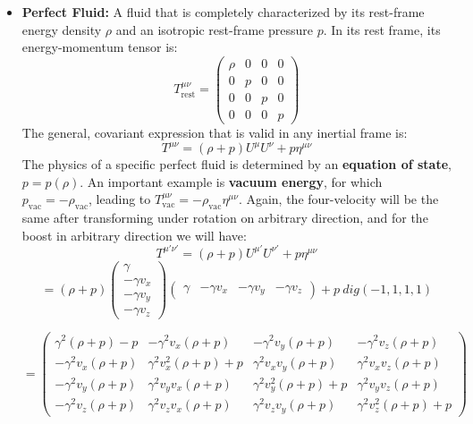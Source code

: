 \documentclass[11pt, a4paper]{report}
\begin{document}
\begin{itemize}
\begin{figure}[h]
\begin{tikzpicture}[scale=1]
\end{tikzpicture}
\caption{Comparison between dust and a perfect fluid. Pressure introduces internal stresses.}
\end{figure}
    \item \textbf{Perfect Fluid:} A fluid that is completely characterized by its rest-frame energy density $\rho$ and an isotropic rest-frame pressure $p$. In its rest frame, its energy-momentum tensor is:
    \begin{equation}
        T^{\mu\nu}_{\text{rest}} =
        \begin{pmatrix}
            \rho & 0 & 0 & 0 \\
            0 & p & 0 & 0 \\
            0 & 0 & p & 0 \\
            0 & 0 & 0 & p
        \end{pmatrix}
    \end{equation}
    The general, covariant expression that is valid in any inertial frame is:
    \begin{equation}
        T^{\mu\nu} = (\rho+p)U^\mu U^\nu + p\eta^{\mu\nu}
    \end{equation}
    The physics of a specific perfect fluid is determined by an \textbf{equation of state}, $p = p(\rho)$. An important example is \textbf{vacuum energy}, for which $p_{\text{vac}} = -\rho_{\text{vac}}$, leading to $T^{\mu\nu}_{\text{vac}} = -\rho_{\text{vac}}\eta^{\mu\nu}$.
    Again, the four-velocity will be the same after transforming under rotation on arbitrary direction, and for the boost in arbitrary direction we will have:
    $$T^{\mu'\nu'} = (\rho + p) U^{\mu'} U^{\nu'} + p \eta^{\mu\nu}$$
    $$= (\rho + p)
    \begin{pmatrix}
        \gamma \\
        -\gamma v_x \\
        -\gamma v_y \\
        -\gamma v_z
    \end{pmatrix}
    \begin{pmatrix}
        \gamma & -\gamma v_x & -\gamma v_y & -\gamma v_z
    \end{pmatrix}+ p \ dig(-1,1,1,1) $$

    $$ =
    \begin{pmatrix}
    \gamma^2(\rho + p) - p & -\gamma^2 v_x (\rho + p) & -\gamma^2 v_y (\rho + p) & -\gamma^2 v_z (\rho + p) \\
    -\gamma^2 v_x (\rho + p) & \gamma^2 v_x^2 (\rho + p) + p & \gamma^2 v_x v_y (\rho + p) & \gamma^2 v_x v_z (\rho + p) \\
    -\gamma^2 v_y (\rho + p) & \gamma^2 v_y v_x (\rho + p) & \gamma^2 v_y^2 (\rho + p) + p & \gamma^2 v_y v_z (\rho + p) \\
    -\gamma^2 v_z (\rho + p) & \gamma^2 v_z v_x (\rho + p) & \gamma^2 v_z v_y (\rho + p) & \gamma^2 v_z^2 (\rho + p) + p
    \end{pmatrix} 
    $$
\end{itemize}
\end{document}
